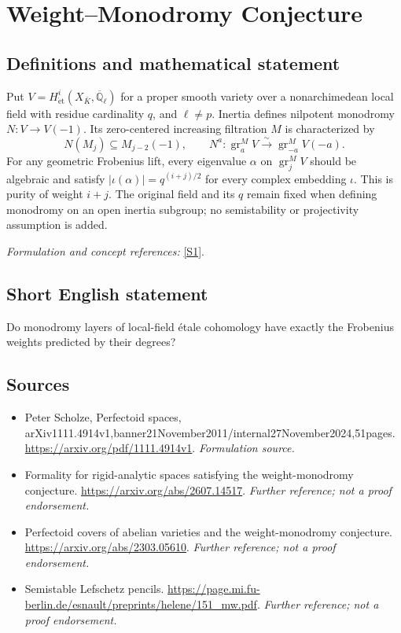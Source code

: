 \documentclass[11pt]{article}
\begin{document}
\section*{\texorpdfstring{Weight–Monodromy Conjecture}{Weight–Monodromy Conjecture}}\label{statement}
\subsection{Definitions and mathematical statement}
Put $V=H^i_{\mathrm{\acute et}}(X_{\bar K},\overline{\mathbb{Q}}_\ell)$ for a proper smooth variety over a nonarchimedean local field with residue cardinality $q$, and $\ell\ne p$. Inertia defines nilpotent monodromy $N:V\to V(-1)$. Its zero-centered increasing filtration $M$ is characterized by
\[
 N(M_j)\subseteq M_{j-2}(-1),\qquad
 N^a:\operatorname{gr}^M_aV\xrightarrow{\sim}\operatorname{gr}^M_{-a}V(-a).
\]
For any geometric Frobenius lift, every eigenvalue $\alpha$ on $\operatorname{gr}^M_jV$ should be algebraic and satisfy $|\iota(\alpha)|=q^{(i+j)/2}$ for every complex embedding $\iota$. This is purity of weight $i+j$. The original field and its $q$ remain fixed when defining monodromy on an open inertia subgroup; no semistability or projectivity assumption is added.
\par\smallskip\textit{Formulation and concept references:} \href{https://arxiv.org/pdf/1111.4914v1}{[S1]}.

\subsection{Short English statement}
Do monodromy layers of local-field étale cohomology have exactly the Frobenius weights predicted by their degrees?
\subsection{Sources}
\begin{itemize}
\item[S1]Peter Scholze, Perfectoid spaces, arXiv1111.4914v1,banner21November2011/internal27November2024,51pages.
\url{https://arxiv.org/pdf/1111.4914v1}.
\textit{Formulation source.}
\item[S2]Formality for rigid-analytic spaces satisfying the weight-monodromy conjecture.
\url{https://arxiv.org/abs/2607.14517}.
\textit{Further reference; not a proof endorsement.}
\item[S3]Perfectoid covers of abelian varieties and the weight-monodromy conjecture.
\url{https://arxiv.org/abs/2303.05610}.
\textit{Further reference; not a proof endorsement.}
\item[S4]Semistable Lefschetz pencils.
\url{https://page.mi.fu-berlin.de/esnault/preprints/helene/151_mw.pdf}.
\textit{Further reference; not a proof endorsement.}
\end{itemize}
\end{document}
